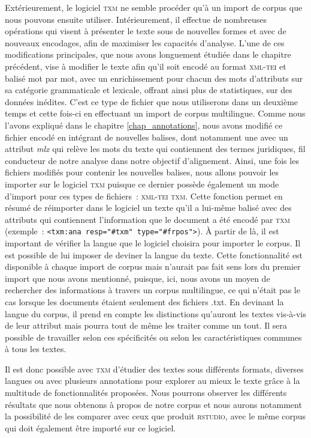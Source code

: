 Extérieurement, le logiciel \textsc{txm} ne semble procéder qu'à un import de corpus que nous pouvons ensuite utiliser. Intérieurement, il effectue de nombreuses opérations qui visent à présenter le texte sous de nouvelles formes et avec de nouveaux encodages, afin de maximiser les capacités d'analyse. L'une de ces modifications principales, que nous avons longuement étudiée dans le chapitre précédent, vise à modifier le texte afin qu'il soit encodé au format \textsc{xml-tei} et balisé mot par mot, avec un enrichissement pour chacun des mots d'attributs sur sa catégorie grammaticale et lexicale, offrant ainsi plus de statistiques, sur des données inédites. C'est ce type de fichier que nous utiliserons dans un deuxième temps et cette fois-ci en effectuant un import de corpus multilingue. Comme nous l'avons expliqué dans le chapitre \ref{chap_annotations}, nous avons modifié ce fichier encodé en intégrant de nouvelles balises, dont notamment une avec un attribut \textit{mlx} qui relève les mots du texte qui contiennent des termes juridiques, fil conducteur de notre analyse dans notre objectif d'alignement. Ainsi, une fois les fichiers modifiés pour contenir les nouvelles balises, nous allons pouvoir les importer sur le logiciel \textsc{txm} puisque ce dernier possède également un mode d'import pour ces types de fichiers~: \textsc{xml-tei txm}. Cette fonction permet en résumé de réimporter dans le logiciel un texte qu'il a lui-même balisé avec des attributs qui contiennent l'information que le document a été encodé par \textsc{txm} (exemple~: \texttt{<txm:ana resp="#txm" type="#frpos">}). À partir de là, il est important de vérifier la langue que le logiciel choisira pour importer le corpus. Il est possible de lui imposer de deviner la langue du texte. Cette fonctionnalité est disponible à chaque import de corpus mais n'aurait pas fait sens lors du premier import que nous avons mentionné, puisque, ici, nous avons un moyen de rechercher des informations à travers un corpus multilingue, ce qui n'était pas le cas lorsque les documents étaient seulement des fichiers .txt. En devinant la langue du corpus, il prend en compte les distinctions qu'auront les textes vis-à-vis de leur attribut mais pourra tout de même les traiter comme un tout. Il sera possible de travailler selon ces spécificités ou selon les caractéristiques communes à tous les textes.

Il est donc possible avec \textsc{txm} d'étudier des textes sous différents formats, diverses langues ou avec plusieurs annotations pour explorer au mieux le texte grâce à la multitude de fonctionnalités proposées. Nous pourrons observer les différents résultats que nous obtenons à propos de notre corpus et nous aurons notamment la possibilité de les comparer avec ceux que produit \textsc{rstudio}, avec le même corpus qui doit également être importé sur ce logiciel.

